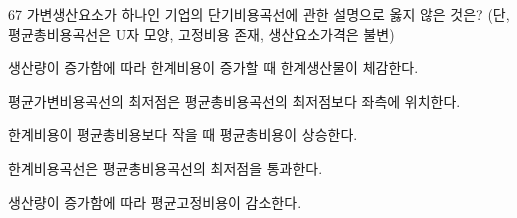 \begin{question}{67}
가변생산요소가 하나인 기업의 단기비용곡선에 관한 설명으로 옳지 않은 것은? (단, 평균총비용곡선은 U자 모양, 고정비용 존재, 생산요소가격은 불변)
\begin{choices}
  \item 생산량이 증가함에 따라 한계비용이 증가할 때 한계생산물이 체감한다.
  \item 평균가변비용곡선의 최저점은 평균총비용곡선의 최저점보다 좌측에 위치한다.
  \item 한계비용이 평균총비용보다 작을 때 평균총비용이 상승한다.
  \item 한계비용곡선은 평균총비용곡선의 최저점을 통과한다.
  \item 생산량이 증가함에 따라 평균고정비용이 감소한다.
\end{choices}
\end{question}
